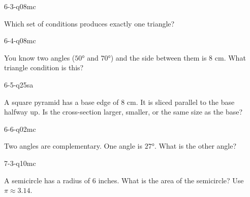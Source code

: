 \begin{practiceQuestion}{6-3-q08}{mc}
\begin{questionText}
Which set of conditions produces exactly one triangle?
\end{questionText}
\end{practiceQuestion}

\begin{practiceQuestion}{6-4-q08}{mc}
\begin{questionText}
You know two angles ($50°$ and $70°$) and the side between them is $8$ cm. What triangle condition is this?
\end{questionText}
\end{practiceQuestion}

\begin{practiceQuestion}{6-5-q25}{sa}
\begin{questionText}
A square pyramid has a base edge of $8$ cm. It is sliced parallel to the base halfway up. Is the cross-section larger, smaller, or the same size as the base?
\end{questionText}
\end{practiceQuestion}

\begin{practiceQuestion}{6-6-q02}{mc}
\begin{questionText}
Two angles are complementary. One angle is $27°$. What is the other angle?
\end{questionText}
\end{practiceQuestion}

\begin{practiceQuestion}{7-3-q10}{mc}
\begin{questionText}
A semicircle has a radius of $6$ inches. What is the area of the semicircle? Use $\pi \approx 3.14$.
\end{questionText}
\end{practiceQuestion}

